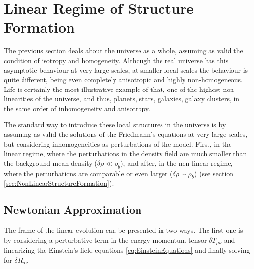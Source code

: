 



\section{Linear Regime of Structure Formation}
\label{sec:LinearStructureFormation}


The previous section deals about the universe as a whole, assuming as 
valid the condition of isotropy and homogeneity. Although the real universe
has this asymptotic behaviour at very large scales, at smaller local scales
the behaviour is quite different, being even completely anisotropic and 
highly non-homogeneous. Life is certainly the most illustrative example of 
that, one of the highest non-linearities of the universe, and thus, 
planets, stars, galaxies, galaxy clusters, in the same order of 
inhomogeneity and anisotropy.


The standard way to introduce these local structures in the universe is by
assuming as valid the solutions of the Friedmann's equations at very large 
scales, but considering inhomogeneities as perturbations of the model. 
First, in the linear regime, where the perturbations in the density field
are much smaller than the background mean density ($\delta \rho \ll 
\rho_b$), and after, in the non-linear regime, where the perturbations are
comparable or even larger ($\delta \rho \sim \rho_b$) (see section 
\ref{sec:NonLinearStructureFormation}).

 

	\subsection{Newtonian Approximation}
	\label{subsec:Newtonian Approximation}



The frame of the linear evolution can be presented in two ways. The first 
one is by considering a perturbative term in the energy-momentum tensor
$ \delta T_{\mu \nu}$ and linearizing the Einstein's field equations 
\ref{eq:EinsteinEquations} and finally solving for $\delta R_{\mu \nu}$



